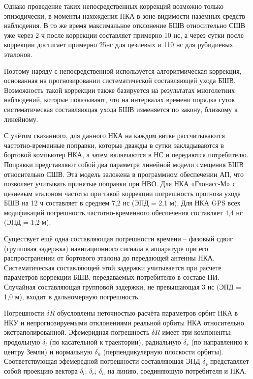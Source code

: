 \documentclass[14pt,a4paper,oneside]{extarticle}
\begin{document}
Однако проведение таких непосредственных коррекций возможно только эпизодически, в моменты нахождения НКА в зоне видимости наземных средств наблюдения. В то же время максимальное отклонение БШВ относительно СШВ уже через 2 ч после коррекции составляет примерно 10 нс, а через сутки после коррекции достигает примерно 25нс для цезиевых и 110 нс для рубидиевых эталонов.

Поэтому наряду с непосредственной используется алгоритмическая коррекция, основанная на прогнозировании систематической составляющей ухода БШВ. Возможность такой коррекции также базируется на результатах многолетних наблюдений, которые показывают, что на интервалах времени порядка суток систематическая составляющая ухода БШВ изменяется по закону, близкому к линейному.

С учётом сказанного, для данного НКА на каждом витке рассчитываются частотно-временные поправки, которые дважды в сутки закладываются в бортовой компьютер НКА, а затем включаются в НС и передаются потребителю. Поправки представляют собой два параметра линейной модели смещения БШВ относительно СШВ. Эта модель заложена в программном обеспечении АП, что позволяет учитывать принятые поправки при НВО. Для НКА «Глонасс-М» с цезиевым эталоном частоты при такой коррекции погрешность прогноза ухода БШВ на 12 ч составляет в среднем 7,2 нс (ЭПД = 2,1 м). Для НКА GPS всех модификаций погрешность частотно-временного обеспечения составляет 4,4 нс (ЭПД = 1,2 м).

Существует ещё одна составляющая погрешности времени – фазовый сдвиг (групповая задержка) навигационного сигнала в аппаратуре при его распространении от бортового эталона до передающей антенны НКА. Систематическая составляющей этой задержки учитывается при расчете параметров коррекции БШВ, передаваемых потребителю в составе НИ. Случайная составляющая групповой задержки, не превышающая 3 нс (ЭПД = 1,0 м), входит в дальномерную погрешность.

Погрешности $\delta R$ обусловлены неточностью расчёта параметров орбит НКА в НКУ и непрогнозируемыми отклонениями реальной орбиты НКА относительно экстраполированной. Эфемеридная погрешность $\delta R$ имеет три компоненты: продольную $\delta_{l}$ (по касательной к траектории), радиальную $\delta_{r}$ (по направлению к центру Земли) и нормальную $\delta_{n}$ (перпендикулярную плоскости орбиты). Соответствующая эфемередной погрешности составляющая ЭПД $\delta_{\text{э}}$ представляет собой проекцию вектора {$\delta_{l}$; $\delta_{r}$; $\delta_{n}$} на линию, соединяющую потребителя и НКА.
\end{document}

